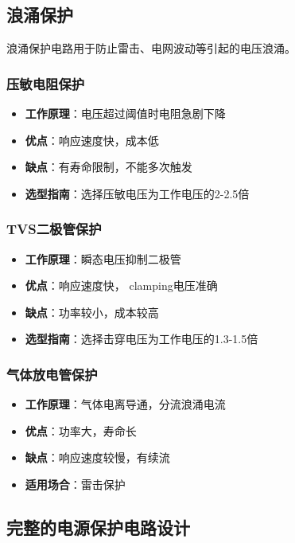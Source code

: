 \documentclass[12pt,UTF8]{ctexbook}
\begin{document}
\subsection{浪涌保护}

浪涌保护电路用于防止雷击、电网波动等引起的电压浪涌。

\subsubsection{压敏电阻保护}
\begin{itemize}
    \item \textbf{工作原理}：电压超过阈值时电阻急剧下降
    \item \textbf{优点}：响应速度快，成本低
    \item \textbf{缺点}：有寿命限制，不能多次触发
    \item \textbf{选型指南}：选择压敏电压为工作电压的2-2.5倍
\end{itemize}

\subsubsection{TVS二极管保护}
\begin{itemize}
    \item \textbf{工作原理}：瞬态电压抑制二极管
    \item \textbf{优点}：响应速度快， clamping电压准确
    \item \textbf{缺点}：功率较小，成本较高
    \item \textbf{选型指南}：选择击穿电压为工作电压的1.3-1.5倍
\end{itemize}

\subsubsection{气体放电管保护}
\begin{itemize}
    \item \textbf{工作原理}：气体电离导通，分流浪涌电流
    \item \textbf{优点}：功率大，寿命长
    \item \textbf{缺点}：响应速度较慢，有续流
    \item \textbf{适用场合}：雷击保护
\end{itemize}

\subsection{完整的电源保护电路设计}
\end{document}
